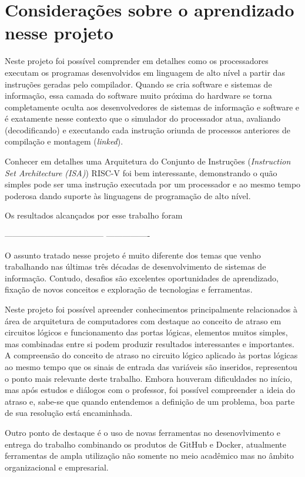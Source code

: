 
\section{Considerações sobre o aprendizado nesse projeto}

Neste projeto foi possível comprender em detalhes como os processadores executam os programas desenvolvidos em linguagem de alto nível a partir das instruções geradas pelo compilador. Quando se cria software e sistemas de informação, essa camada do software muito próxima do hardware se torna completamente oculta aos desenvolvedores de sistemas de informação e software e é exatamente nesse contexto que o simulador do processador atua, avaliando (decodificando) e executando cada instrução oriunda de processos anteriores de compilação e montagem (\textit{linked}).

Conhecer em detalhes uma Arquitetura do Conjunto de Instruções (\textit{Instruction Set Architecture (ISA)}) RISC-V foi bem interessante, demonstrando o quão simples pode ser uma instrução executada por um processador e ao mesmo tempo poderosa dando suporte às linguagens de programação de alto nível.

Os resultados alcançados por esse trabalho foram 



------------------------------------ ---------------- 

O assunto tratado nesse projeto é muito diferente dos temas que venho trabalhando nas últimas três décadas
de desenvolvimento de sistemas de informação. Contudo, desafios são excelentes oportunidades de aprendizado, 
fixação de novos conceitos e exploração de tecnologias e ferramentas.

Neste projeto foi possível apreender conhecimentos principalmente relacionados à área de arquitetura de computadores 
com destaque ao conceito de atraso em circuitos lógicos e funcionamento das portas lógicas,
elementos muitos simples, mas combinadas entre si podem produzir resultados interessantes e importantes.
A compreensão do conceito de atraso no circuito lógico aplicado às portas lógicas 
ao mesmo tempo que os sinais de entrada das variáveis são inseridos, representou 
o ponto mais relevante deste trabalho. Embora houveram dificuldades no início, mas 
após estudos e diálogos com o professor, foi possível compreender a ideia do atraso e, sabe-se  que quando entendemos 
a definição de um problema, boa parte de sua resolução está encaminhada.

Outro ponto de destaque é o uso de novas ferramentas no desenovlvimento e entrega do trabalho combinando os produtos 
de GitHub e Docker, 
atualmente ferramentas de ampla utilização não somente no meio acadêmico mas no âmbito organizacional e empresarial.

